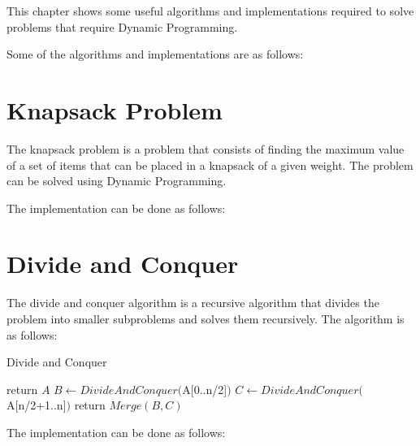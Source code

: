 This chapter shows some useful algorithms and implementations required to solve problems that require Dynamic Programming.

Some of the algorithms and implementations are as follows:

















\section{Knapsack Problem}

The knapsack problem is a problem that consists of finding the maximum value of a set of items that can be placed in a knapsack of a given weight. The problem can be solved using Dynamic Programming.

The implementation can be done as follows:





\section{Divide and Conquer}

The divide and conquer algorithm is a recursive algorithm that divides the problem into smaller subproblems and solves them recursively. The algorithm is as follows:

\begin{algorithm}
\caption{Divide and Conquer}
\label{alg:divideandconquer}
\begin{algorithmic}[1]
\State return $A$
\EndIf
\State $B \gets DivideAndConquer($A[0..n/2]$)$
\State $C \gets DivideAndConquer($A[n/2+1..n]$)$
\State return $Merge(B, C)$
\EndProcedure
\end{algorithmic}
\end{algorithm}

The implementation can be done as follows:

